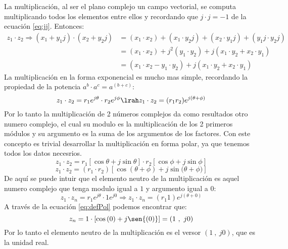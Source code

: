     La multiplicación, al ser el plano complejo un campo vectorial, se computa multiplicando todos los elementos entre ellos y recordando que $j\cdot j=-1$ de la ecuación \ref{eq:jj}. Entonces: 
        \begin{equation}\label{eq:mul}
        \begin{aligned}
            z_1\cdot z_2 \Rightarrow (x_1+y_1j)\cdot(x_2+y_2j)&=(x_1\cdot x_2)+(x_1\cdot y_2j)+(x_2\cdot y_1j)+(y_1j\cdot y_2j)\\
             &=(x_1\cdot x_2)+j^2(y_1\cdot y_2)+j(x_1\cdot y_2+x_2\cdot y_1)\\
             &=(x_1\cdot x_2-y_1\cdot y_2)+j(x_1\cdot y_2+x_2\cdot y_1)
        \end{aligned}
        \end{equation}
    La multiplicación en la forma exponencial es mucho mas simple, recordando la propiedad de la potencia $a^b \cdot a^c=a^{(b+c)}$:
    \begin{equation}\label{eq:mulE}
        z_1\cdot z_2 = r_1e^{j\theta}\cdot r_2e^{j\phi} \lrah z_1\cdot z_2 = (r_1 r_2)e^{j(\theta+\phi)}
    \end{equation}
    Por lo tanto la multiplicación de 2 números complejos da como resultados otro numero complejo, el cual su modulo es la multiplicación de los 2 primeros módulos y su argumento es la suma de los argumentos de los factores. Con este concepto es trivial desarrollar la multiplicación en forma polar, ya que tenemos todos los datos necesrios.
    \begin{equation*}
         z_1\cdot z_2=r_1[\cos{\theta}+j\sin{\theta}]\cdot r_2[\cos{\phi}+j\sin{\phi}]
    \end{equation*}
    \begin{equation}
        z_1\cdot z_2 =(r_1\cdot r_2)[\cos{(\theta +\phi)}+j \sin{(\theta +\phi})]
    \end{equation}
    De aquí se puede intuir que el elemento neutro de la multiplicación es aquel numero complejo que tenga modulo igual a $1$ y argumento igual a $0$:
    \begin{equation}
        z_1\cdot z_n = r_1e^{j\theta}\cdot 1e^{j0} \Longrightarrow z_1\cdot z_n = (r_1 1)e^{j(\theta+0)}
    \end{equation}
    A través de la ecuación \ref{eq:defPol} podemos encontrar que:
    \begin{equation}
        z_n = 1\cdot[\cos{(0)}+j\sen{(0)}] = (1\ ,\ j0)
    \end{equation}
    Por lo tanto el elemento neutro de la multiplicación es el versor $(1\ ,\ j0)$, que es la unidad real.
    

